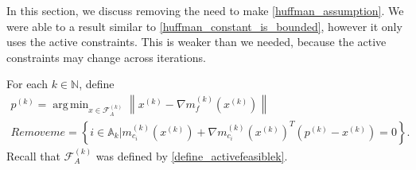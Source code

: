 \documentclass{article}
\theoremstyle{case}
\numberwithin{theorem}{subsection}
\DeclareMathOperator*{\argmin}{arg\,min}
\newcommand{\activeconstraintsk}{{\mathbb A_{k}}}
\newcommand{\gk}{{\nabla m_f^{(k)}\left(\xk\right)}}
\newcommand{\gmcik}{{\nabla m_{c_i}^{(k)}\left(\xk\right)}}
\newcommand{\mcik}{{{m}^{(k)}_{c_i}}}
\newcommand{\naturals}{\mathbb N}
\newcommand{\xk}{x^{(k)}}
\newcommand{\activefeasiblek}{{\mathcal F^{(k)}_A}}
\newcommand{\projk}{{p^{(k)}}}
\newcommand{\activeprojk}{{Remove me}}
\begin{document}
In this section, we discuss removing the need to make \cref{huffman_assumption}.
We were able to a result similar to \cref{huffman_constant_is_bounded}, however it only uses the active constraints.
This is weaker than we needed, because the active constraints may change across iterations.

For each $k \in \naturals$, define
\begin{align}
\projk = \argmin_{x \in \activefeasiblek} \left\|\xk - \gk\right\| \label{define_projectionk} \\
\activeprojk = \left\{ i \in \activeconstraintsk \bigg| \mcik\left(\xk\right) + \gmcik^T \left(\projk - \xk\right) = 0 \right\} \label{define_active_projection_indices}
.
\end{align}
Recall that $\activefeasiblek$ was defined by \cref{define_activefeasiblek}.
\end{document}
